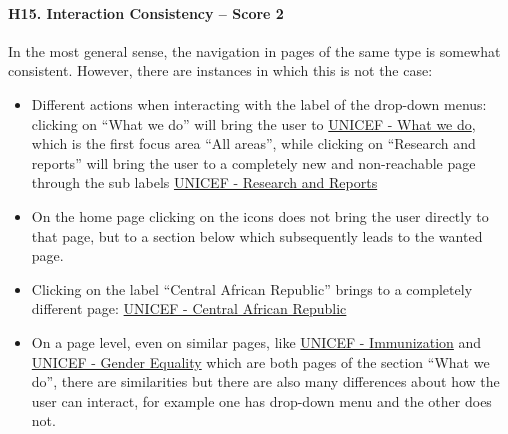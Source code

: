 \paragraph*{H15. Interaction Consistency – Score 2}
In the most general sense, the navigation in pages of the same type is somewhat consistent. However, there are instances in which this is not the case:
\begin{itemize}
	\item Different actions when interacting with the label of the drop-down menus: clicking on “What we do” will bring the user to \href{https://www.unicef.org/what-we-do}{UNICEF - What we do}, which is the first focus area “All areas”, while clicking on “Research and reports” will bring the user to a completely new and non-reachable page through the sub labels \href{https://www.unicef.org/research-and-reports}{UNICEF - Research and Reports}
	\item On the home page clicking on the icons does not bring the user directly to that page, but to a section below which subsequently leads to the wanted page.
	\item Clicking on the label “Central African Republic” brings to a completely different page: \href{https://www.unicef.org/car/en}{UNICEF - Central African Republic}
	\item On a page level, even on similar pages, like \href{https://www.unicef.org/immunization}{UNICEF - Immunization} and \href{https://www.unicef.org/gender-equality}{UNICEF - Gender Equality} which are both pages of the section “What we do”, there are similarities but there are also many differences about how the user can interact, for example one has drop-down menu and the other does not.
\end{itemize}

